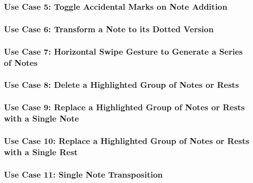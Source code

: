 \subsubsection{Use Case 5: Toggle Accidental Marks on Note Addition}


\subsubsection{Use Case 6: Transform a Note to its Dotted Version}


\subsubsection{Use Case 7: Horizontal Swipe Gesture to Generate a Series of Notes}


\subsubsection{Use Case 8: Delete a Highlighted Group of Notes or Rests}


\subsubsection{Use Case 9: Replace a Highlighted Group of Notes or Rests with a Single Note}


\subsubsection{Use Case 10: Replace a Highlighted Group of Notes or Rests with a Single Rest}



\subsubsection{Use Case 11: Single Note Transposition}

